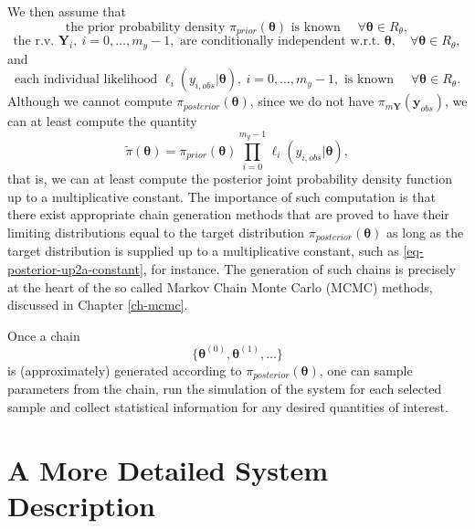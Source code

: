 We then assume that
\begin{equation}\label{eq-hyp-prior-known}
\mbox{the prior probability density }\pi_{prior}(\boldsymbol{\theta})\mbox{ is known }\quad\forall\boldsymbol\theta\in R_{\theta},
\end{equation}
\begin{equation}\label{eq-hyp-conditional-independence}
\mbox{the r.v. }\mathbf{Y}_i,~i=0,\ldots,m_y-1,\mbox{ are conditionally independent w.r.t. }\boldsymbol\theta,\quad\forall\boldsymbol\theta\in R_{\theta},
\end{equation}
and
\begin{equation}\label{eq-hyp-l-known}
\mbox{each individual likelihood }\ell_i(y_{i,obs}|\boldsymbol\theta),~i=0,\ldots,m_y-1,\mbox{ is known }\quad\forall\boldsymbol\theta\in R_{\theta}.
\end{equation}
Although we cannot compute $\pi_{posterior}(\boldsymbol\theta)$,
since we do not have $\pi_{m\mathbf{Y}}(\mathbf{y}_{obs})$,
we can at least compute the quantity
\begin{equation}\label{eq-posterior-up2a-constant}
\tilde{\pi}(\boldsymbol\theta) =
{\pi_{prior}(\boldsymbol\theta)\prod_{i=0}^{m_y-1}\ell_i(y_{i,obs}|\boldsymbol\theta)},
\end{equation}
that is, we can at least compute the posterior joint probability density function up to a multiplicative constant.
The importance of such computation is that there exist
appropriate chain generation methods that are proved to have their limiting distributions equal 
to the target distribution $\pi_{posterior}(\boldsymbol\theta)$ as long as the target distribution is supplied
up to a multiplicative constant, such as \eqref{eq-posterior-up2a-constant}, for instance.
The generation of such chains is precisely at the heart of the so called Markov Chain Monte Carlo (MCMC) methods,
discussed in Chapter \ref{ch-mcmc}.

Once a chain
\begin{equation}\label{eq-markov-chain}
\{\boldsymbol{\theta}^{(0)},\boldsymbol{\theta}^{(1)},\ldots\}
\end{equation}
is (approximately) generated according to $\pi_{posterior}(\boldsymbol\theta)$, one can
sample parameters from the chain,
run the simulation of the system for each selected sample and
collect statistical information for any desired quantities of interest.

\section{A More Detailed System Description}\label{sc-intro-detail}


